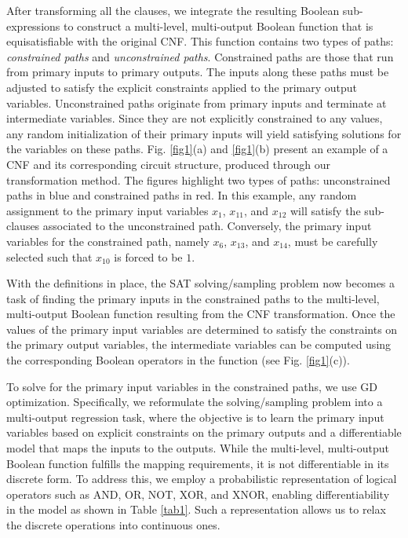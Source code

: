 After transforming all the clauses, we integrate the resulting Boolean sub-expressions to construct a multi-level, multi-output Boolean function that is equisatisfiable with the original CNF. This function contains two types of paths: \textit{constrained paths} and \textit{unconstrained paths}. Constrained paths are those that run from primary inputs to primary outputs. The inputs along these paths must be adjusted to satisfy the explicit constraints applied to the primary output variables. Unconstrained paths originate from primary inputs and terminate at intermediate variables. Since they are not explicitly constrained to any values, any random initialization of their primary inputs will yield satisfying solutions for the variables on these paths. Fig. \ref{fig1}(a) and \ref{fig1}(b) present an example of a CNF and its corresponding circuit structure, produced through our transformation method. The figures highlight two types of paths: unconstrained paths in blue and constrained paths in red. In this example, any random assignment to the primary input variables $x_1$, $x_{11}$, and $x_{12}$ will satisfy the sub-clauses associated to the unconstrained path. Conversely, the primary input variables for the constrained path, namely $x_6$, $x_{13}$, and $x_{14}$, must be carefully selected such that $x_{10}$ is forced to be $1$.


With the definitions in place, the SAT solving/sampling problem now becomes a task of finding the primary inputs in the constrained paths to the multi-level, multi-output Boolean function resulting from the CNF transformation. Once the values of the primary input variables are determined to satisfy the constraints on the primary output variables, the intermediate variables can be computed using the corresponding Boolean operators in the function (see Fig. \ref{fig1}(c)).

To solve for the primary input variables in the constrained paths, we use GD optimization. Specifically, we reformulate the solving/sampling problem into a multi-output regression task, where the objective is to learn the primary input variables based on explicit constraints on the primary outputs and a differentiable model that maps the inputs to the outputs. While the multi-level, multi-output Boolean function fulfills the mapping requirements, it is not differentiable in its discrete form. To address this, we employ a probabilistic representation of logical operators \cite{Ardakani2017SC, NEURIPS2019_6562c5c1} such as AND, OR, NOT, XOR, and XNOR, enabling differentiability in the model as shown in Table \ref{tab1}. Such a representation allows us to relax the discrete operations into continuous ones.


